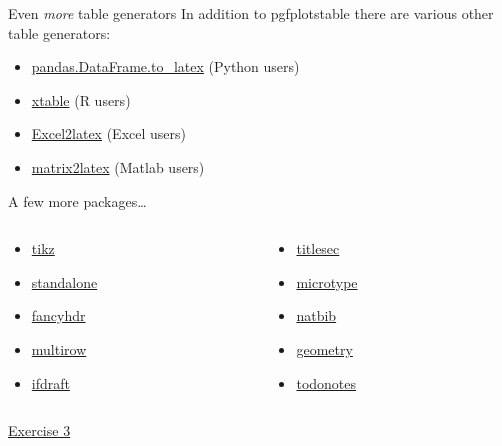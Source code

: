 \begin{frame}{Even \textit{more} table generators}
  In addition to pgfplotstable there are various other table generators:
  \begin{itemize}
    \item \href{https://pandas.pydata.org/pandas-docs/stable/generated/pandas.DataFrame.to_latex.html}%
      {pandas.DataFrame.to\_latex} (Python users)
    \item \href{https://www.rdocumentation.org/packages/xtable/versions/1.8-3/topics/xtable}%
      {xtable} (R users)
    \item \href{https://ctan.org/pkg/excel2latex?lang=en}{Excel2latex}
      (Excel users)
    \item \href{https://uk.mathworks.com/matlabcentral/fileexchange/4894-matrix2latex?s_tid=FX_rc2_behav}%
      {matrix2latex} (Matlab users)
  \end{itemize}
\end{frame}

\begin{frame}{A few more packages\ldots}
  \begin{columns}
    \begin{column}{0.5\textwidth}
      \begin{itemize}
        \item \href{http://www.texample.net/tikz/}{tikz}
        \item \href{https://ctan.org/pkg/standalone?lang=en}{standalone}
        \item \href{https://ctan.org/pkg/fancyhdr?lang=en}{fancyhdr}
        \item \href{https://ctan.org/pkg/multirow?lang=en}{multirow}
        \item \href{https://ctan.org/pkg/ifdraft?lang=en}{ifdraft}
      \end{itemize}
    \end{column}
    \begin{column}{0.5\textwidth}
      \begin{itemize}
        \item \href{https://ctan.org/pkg/titlesec?lang=en}{titlesec}
        \item \href{https://ctan.org/pkg/microtype?lang=en}{microtype}
        \item \href{https://ctan.org/pkg/natbib?lang=en}{natbib}
        \item \href{https://ctan.org/pkg/geometry}{geometry}
        \item \href{https://ctan.org/pkg/todonotes?lang=en}{todonotes}
      \end{itemize}
    \end{column}
  \end{columns}
\end{frame}

\begin{frame}[standout]
  \href{https://jwalton.info/assets/teaching/latex/exercise_3.pdf}%
  {\color{white}Exercise 3}
\end{frame}
